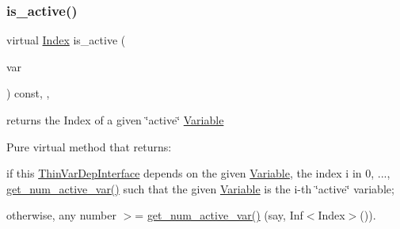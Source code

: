 \mbox{\label{class_s_m_spp__di__unipi__it_1_1_one_var_constraint_a4dbea8d93b14035203b5edce6fd35cfb}} 
\subsubsection{\texorpdfstring{is\+\_\+active()}{is\_active()}}
{\footnotesize\ttfamily virtual \mbox{\hyperlink{group___thin_var_dep_interface___c_l_a_s_s_e_s_gad53d6229d7ec28555a9c9c2fd9abf773}{Index}} is\+\_\+active (\begin{DoxyParamCaption}\item[{const \mbox{\hyperlink{class_s_m_spp__di__unipi__it_1_1_variable}{Variable}} $\ast$const}]{var }\end{DoxyParamCaption}) const\hspace{0.3cm}{\ttfamily [inline]}, {\ttfamily [override]}, {\ttfamily [virtual]}}



returns the Index of a given \char`\"{}active\char`\"{} \mbox{\hyperlink{class_s_m_spp__di__unipi__it_1_1_variable}{Variable}} 

Pure virtual method that returns\+:


\begin{DoxyItemize}
\item if this \mbox{\hyperlink{class_s_m_spp__di__unipi__it_1_1_thin_var_dep_interface}{Thin\+Var\+Dep\+Interface}} depends on the given \mbox{\hyperlink{class_s_m_spp__di__unipi__it_1_1_variable}{Variable}}, the index i in 0, ..., \mbox{\hyperlink{class_s_m_spp__di__unipi__it_1_1_one_var_constraint_acc8ac3c57cc2c71ac3fe6c409fe53074}{get\+\_\+num\+\_\+active\+\_\+var()}} such that the given \mbox{\hyperlink{class_s_m_spp__di__unipi__it_1_1_variable}{Variable}} is the i-\/th \char`\"{}active\char`\"{} variable;
\item otherwise, any number $>$= \mbox{\hyperlink{class_s_m_spp__di__unipi__it_1_1_one_var_constraint_acc8ac3c57cc2c71ac3fe6c409fe53074}{get\+\_\+num\+\_\+active\+\_\+var()}} (say, Inf$<$\+Index$>$()).
\end{DoxyItemize}

